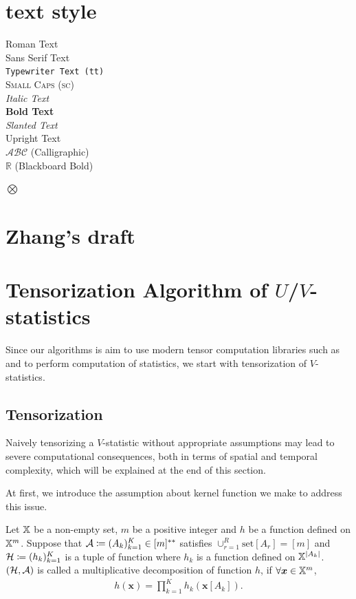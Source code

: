 \documentclass[letterpaper,11pt]{article}
\newcommand{\pdfu}{\texorpdfstring{$U$}{U}}
\newcommand{\pdfv}{\texorpdfstring{$V$}{V}}
\newcommand{\samplespace}{\bbX}
\newcommand{\takesetp}[1]{\mathrm{set}[#1]}
\begin{document}
\section{text style}

\textrm{Roman Text} \\
\textsf{Sans Serif Text} \\
\texttt{Typewriter Text (tt)} \\
\textsc{Small Caps (sc)} \\
\textit{Italic Text} \\
\textbf{Bold Text} \\
{\slshape Slanted Text} \\
{\upshape Upright Text} \\
$\mathcal{ABC}$ (Calligraphic) \\
$\mathbb{R}$ (Blackboard Bold)

$\bigotimes$

\section{Zhang's draft}


\section{Tensorization Algorithm of \pdfu{}/\pdfv{}-statistics}\label{sec:v_alg}

Since our algorithms is aim to use modern tensor computation libraries such as \numpy{} and \torch{} to perform computation of statistics, we start with tensorization of $V$-statistics.  

\subsection{Tensorization}\label{sec:tensorization}

Naively tensorizing a $V$-statistic without appropriate assumptions may lead to severe computational consequences, both in terms of spatial and temporal complexity, which will be explained at the end of this section. 

At first, we introduce the assumption about kernel function we make to address this issue. 
\begin{definition}\label{def:mul_decomp}
    Let $\samplespace$ be a non-empty set, $m$ be a positive integer and $h$ be a function defined on $\samplespace^m$. Suppose that ${\mathcal{A}} \coloneqq (A_k)_{k=1}^K \in [m]^{**}$ satisfies $\cup_{r=1}^R \takesetp{A_r} = [m]$ and ${\mathcal{H}} \coloneqq (h_k)_{k=1}^K$ is a tuple of function where $h_k$ is a function defined on $\samplespace^{|A_k|}$. $({\mathcal{H}}, {\mathcal{A}})$ is called a multiplicative decomposition of function $h$, if $\forall \bm{x} \in \samplespace^m$, 
    \begin{align*}
        h(\bm{x}) = \prod_{k=1}^K h_k(\bm{x}[A_k]). 
    \end{align*}
    
\end{definition}
\end{document}
